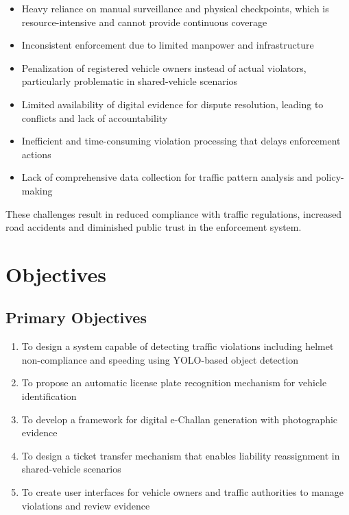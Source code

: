 \documentclass[12pt, a4paper, oneside]{memoir}
\begin{document}
\begin{itemize}
    \item Heavy reliance on manual surveillance and physical checkpoints, which is resource-intensive and cannot provide continuous coverage
    \item Inconsistent enforcement due to limited manpower and infrastructure
    \item Penalization of registered vehicle owners instead of actual violators, particularly problematic in shared-vehicle scenarios
    \item Limited availability of digital evidence for dispute resolution, leading to conflicts and lack of accountability
    \item Inefficient and time-consuming violation processing that delays enforcement actions
    \item Lack of comprehensive data collection for traffic pattern analysis and policy-making
\end{itemize}

These challenges result in reduced compliance with traffic regulations, increased road accidents and diminished public trust in the enforcement system.

\section{Objectives}

\subsection{Primary Objectives}
\begin{enumerate}
    \item To design a system capable of detecting traffic violations including helmet non-compliance and speeding using YOLO-based object detection
    \item To propose an automatic license plate recognition mechanism for vehicle identification
    \item To develop a framework for digital e-Challan generation with photographic evidence
    \item To design a ticket transfer mechanism that enables liability reassignment in shared-vehicle scenarios
    \item To create user interfaces for vehicle owners and traffic authorities to manage violations and review evidence
\end{enumerate}
\end{document}
